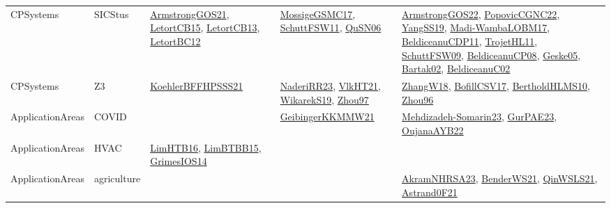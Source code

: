 {\begin{longtable}{lp{3cm}>{\raggedright}p{6cm}>{\raggedright}p{6cm}p{8cm}}
CPSystems & SICStus & \href{papers/ArmstrongGOS21.pdf}{ArmstrongGOS21}\cite{ArmstrongGOS21}, \href{articles/LetortCB15.pdf}{LetortCB15}\cite{LetortCB15}, \href{papers/LetortCB13.pdf}{LetortCB13}\cite{LetortCB13}, \href{papers/LetortBC12.pdf}{LetortBC12}\cite{LetortBC12} & \href{papers/MossigeGSMC17.pdf}{MossigeGSMC17}\cite{MossigeGSMC17}, \href{articles/SchuttFSW11.pdf}{SchuttFSW11}\cite{SchuttFSW11}, \href{papers/QuSN06.pdf}{QuSN06}\cite{QuSN06} & \href{papers/ArmstrongGOS22.pdf}{ArmstrongGOS22}\cite{ArmstrongGOS22}, \href{papers/PopovicCGNC22.pdf}{PopovicCGNC22}\cite{PopovicCGNC22}, \href{papers/YangSS19.pdf}{YangSS19}\cite{YangSS19}, \href{papers/Madi-WambaLOBM17.pdf}{Madi-WambaLOBM17}\cite{Madi-WambaLOBM17}, \href{articles/BeldiceanuCDP11.pdf}{BeldiceanuCDP11}\cite{BeldiceanuCDP11}, \href{articles/TrojetHL11.pdf}{TrojetHL11}\cite{TrojetHL11}, \href{papers/SchuttFSW09.pdf}{SchuttFSW09}\cite{SchuttFSW09}, \href{papers/BeldiceanuCP08.pdf}{BeldiceanuCP08}\cite{BeldiceanuCP08}, \href{papers/Geske05.pdf}{Geske05}\cite{Geske05}, \href{papers/Bartak02.pdf}{Bartak02}\cite{Bartak02}, \href{papers/BeldiceanuC02.pdf}{BeldiceanuC02}\cite{BeldiceanuC02}\\
CPSystems & Z3 & \href{articles/KoehlerBFFHPSSS21.pdf}{KoehlerBFFHPSSS21}\cite{KoehlerBFFHPSSS21} & \href{articles/NaderiRR23.pdf}{NaderiRR23}\cite{NaderiRR23}, \href{articles/VlkHT21.pdf}{VlkHT21}\cite{VlkHT21}, \href{articles/WikarekS19.pdf}{WikarekS19}\cite{WikarekS19}, \href{articles/Zhou97.pdf}{Zhou97}\cite{Zhou97} & \href{articles/ZhangW18.pdf}{ZhangW18}\cite{ZhangW18}, \href{papers/BofillCSV17.pdf}{BofillCSV17}\cite{BofillCSV17}, \href{papers/BertholdHLMS10.pdf}{BertholdHLMS10}\cite{BertholdHLMS10}, \href{papers/Zhou96.pdf}{Zhou96}\cite{Zhou96}\\
ApplicationAreas & COVID &  & \href{papers/GeibingerKKMMW21.pdf}{GeibingerKKMMW21}\cite{GeibingerKKMMW21} & \href{papers/Mehdizadeh-Somarin23.pdf}{Mehdizadeh-Somarin23}\cite{Mehdizadeh-Somarin23}, \href{articles/GurPAE23.pdf}{GurPAE23}\cite{GurPAE23}, \href{papers/OujanaAYB22.pdf}{OujanaAYB22}\cite{OujanaAYB22}\\
ApplicationAreas & HVAC & \href{papers/LimHTB16.pdf}{LimHTB16}\cite{LimHTB16}, \href{papers/LimBTBB15.pdf}{LimBTBB15}\cite{LimBTBB15}, \href{articles/GrimesIOS14.pdf}{GrimesIOS14}\cite{GrimesIOS14} &  & \\
ApplicationAreas & agriculture &  &  & \href{articles/AkramNHRSA23.pdf}{AkramNHRSA23}\cite{AkramNHRSA23}, \href{papers/BenderWS21.pdf}{BenderWS21}\cite{BenderWS21}, \href{articles/QinWSLS21.pdf}{QinWSLS21}\cite{QinWSLS21}, \href{papers/Astrand0F21.pdf}{Astrand0F21}\cite{Astrand0F21}\\

\end{longtable}}

